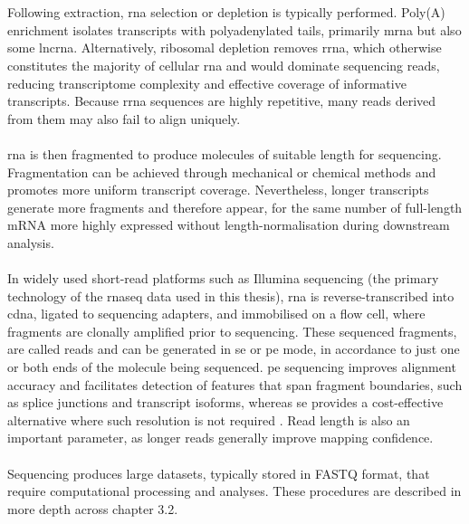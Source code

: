 \\
\\
Following extraction, \gls{rna} selection or depletion is typically performed. Poly(A) enrichment isolates transcripts with polyadenylated tails, primarily \gls{mrna} but also some \gls{lncrna}\cite{chu_rna_2012}. Alternatively, ribosomal depletion removes \gls{rrna}, which otherwise constitutes the majority of cellular \gls{rna} and would dominate sequencing reads, reducing transcriptome complexity and effective coverage of informative transcripts\cite{chu_rna_2012}. Because \gls{rrna} sequences are highly repetitive, many reads derived from them may also fail to align uniquely\cite{chu_rna_2012}.
\\
\\
\gls{rna} is then fragmented to produce molecules of suitable length for sequencing\cite{chu_rna_2012, phipson_gene_2017}. Fragmentation can be achieved through mechanical or chemical methods and promotes more uniform transcript coverage\cite{chu_rna_2012, phipson_gene_2017}. Nevertheless, longer transcripts generate more fragments and therefore appear, for the same number of full-length mRNA more highly expressed without length-normalisation during downstream analysis\cite{phipson_gene_2017}.
\\
\\
In widely used short-read platforms such as Illumina sequencing (the primary technology of the \gls{rnaseq} data used in this thesis), \gls{rna} is reverse-transcribed into \gls{cdna}, ligated to sequencing adapters, and immobilised on a flow cell, where fragments are clonally amplified prior to sequencing\cite{chu_rna_2012}. These sequenced fragments, are called reads and can be generated in \gls{se} or \gls{pe} mode, in accordance to just one or both ends of the molecule being sequenced. \gls{pe} sequencing improves alignment accuracy and facilitates detection of features that span fragment boundaries, such as splice junctions and transcript isoforms, whereas \gls{se} provides a cost-effective alternative where such resolution is not required \cite{nakazato_experimental_2013}. Read length is also an important parameter, as longer reads generally improve mapping confidence\cite{phipson_gene_2017}.
\\
\\
Sequencing produces large datasets, typically stored in FASTQ format, that require computational processing and analyses\cite{chu_rna_2012, nakazato_experimental_2013}. These procedures are described in more depth across chapter 3.2.


